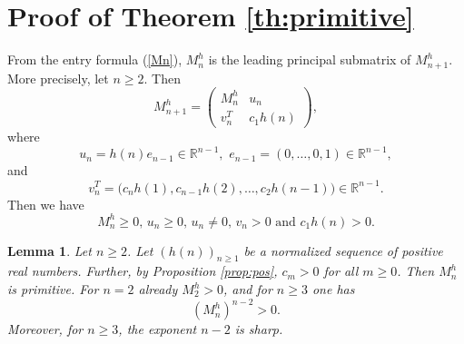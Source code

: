 \documentclass[11pt,reqno]{amsart}
\theoremstyle{plain}
\newtheorem{lemma}[theorem]{Lemma}
\theoremstyle{remark}
\theoremstyle{definition}
\numberwithin{equation}{section}
\begin{document}

\section{Proof of Theorem \ref{th:primitive}}
\label{th:frob}
From the entry formula (\ref{Mn}), $M_n^h$ is the leading principal submatrix of $M_{n+1}^h$. More precisely, let $n \geq 2$. Then
\begin{equation*} \label{decom}
 M_{n+1}^h=\begin{pmatrix}
 M_n^h &u_n\\
 v_n^T&c_1h(n)
 \end{pmatrix},
\end{equation*}
where
\[
 u_n=h(n)e_{n-1} \in \mathbb{R}^{n-1}, \,\, e_{n-1}=(0,\ldots,0,1)\in \mathbb{R}^{n-1},
\]
and
\begin{equation*}
 v_n^{T}
 =\bigl(c_nh(1),c_{n-1}h(2),\ldots,c_2h(n-1)\bigr) \in \mathbb{R}^{n-1}.
\end{equation*}
Then we have
\begin{equation*} \label{decom vektor}
M_n^h \geq 0, \, u_n \geq 0, \, u_n \neq 0, \, v_n >0 \text{ and } %
c_{1}h\left( n\right) >0.
\end{equation*}
\begin{lemma}\label{lem:primitive-Mnh}
Let $n\ge2$. Let $\left(
h(n)\right)
_{n\geq 1}$ be a normalized sequence of positive
real numbers. Further, by Proposition \ref{prop:pos}, $c_m>0$ for all
$m\ge0$. Then $M_n^h$ is primitive. For $n=2$ already $M_2^h>0$, and for
$n\ge3$ one has
\[
   (M_n^h)^{n-2}>0.
\]
Moreover, for $n\ge3$, the exponent $n-2$ is sharp.
\end{lemma}
\end{document}
